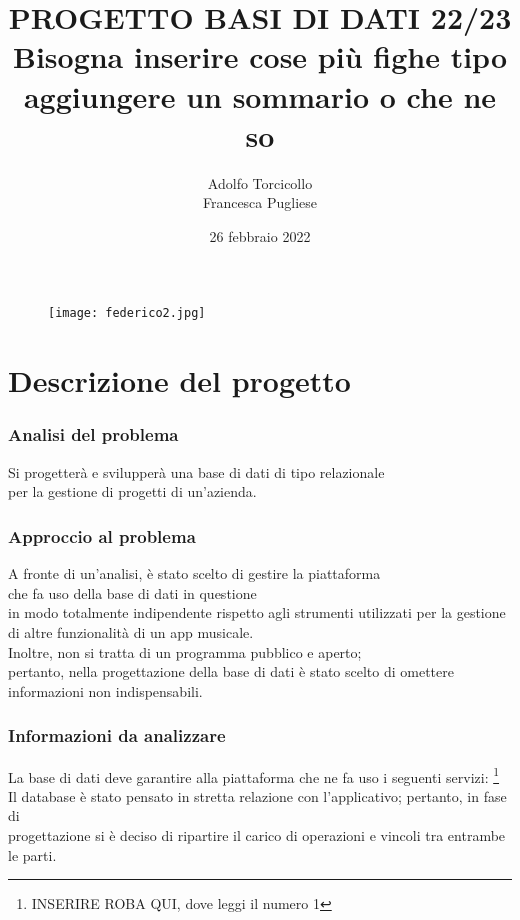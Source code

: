 \documentclass[11pt]{article}
\title{PROGETTO BASI DI DATI 22/23 \\ Bisogna inserire cose più fighe tipo aggiungere un sommario o che ne so }
\author{Adolfo Torcicollo \\ Francesca Pugliese}
\date{26 febbraio 2022}
\begin{document}
	\begin{figure}
		\centering
		\texttt{[image: federico2.jpg]}
		\maketitle
	\end{figure}


	\clearpage

	\part{Descrizione del progetto}
	\section{Analisi del problema}
	
	Si progetterà e svilupperà una base di dati di tipo relazionale\\ per la gestione di progetti di un’azienda. \\
	
	\section{Approccio al problema}
	
	A fronte di un’analisi, è stato scelto di gestire la piattaforma\\ che fa uso della base di dati in questione \\
	in modo totalmente indipendente rispetto agli strumenti utilizzati per la gestione di altre funzionalità di un app musicale.\\
	Inoltre, non si tratta di un programma pubblico e aperto;\\ pertanto, nella progettazione della base di dati è stato scelto di omettere 
	informazioni non indispensabili.\\
	
	\section{Informazioni da analizzare}
	
	La base di dati deve garantire alla piattaforma che ne fa uso i seguenti servizi:
	\footnote{INSERIRE ROBA QUI, dove leggi il numero 1}
	Il database è stato pensato in stretta relazione con l’applicativo; pertanto, in fase di \\ 
	progettazione si è deciso di ripartire il carico di operazioni e vincoli tra entrambe le parti.\\
	
\end{document}

